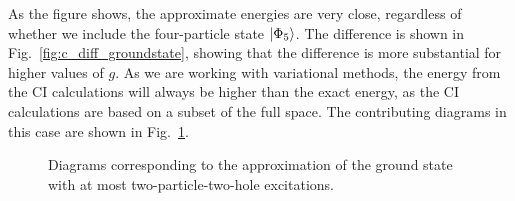 As the figure shows, the approximate energies are very close, regardless of whether we include the four-particle state $\lvert\Phi_5\rangle$.
The difference is shown in Fig.~\ref{fig:c_diff_groundstate}, showing that the difference is more substantial for higher values of $g$.
As we are working with variational methods, the energy from the CI calculations will always be higher than the exact energy, as the CI calculations are based on a subset of the full space.
The contributing diagrams in this case are shown in Fig.~\ref{fig:2p2h}.

\begin{figure}
    \centering
    
    \caption{
        Diagrams corresponding to the approximation of the ground state with at most two-particle-two-hole excitations.\label{fig:2p2h}
    }
\end{figure}
